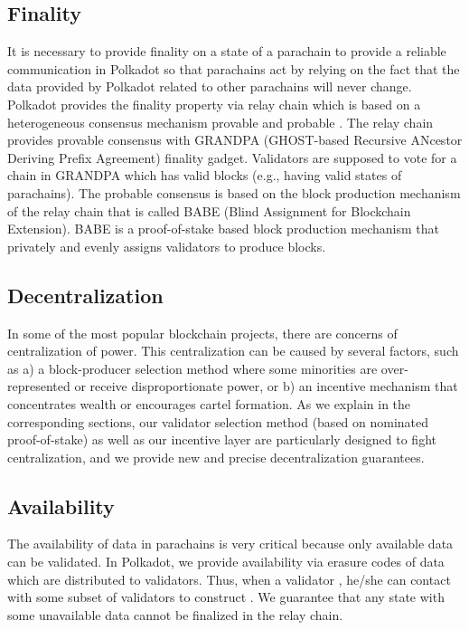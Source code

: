  \subsection{Finality}

 It is necessary to provide finality on a state of a parachain  to provide a reliable communication in Polkadot so that parachains act by relying on the fact that the data provided by Polkadot related to other parachains will never change.  Polkadot provides the finality property via relay chain which is based on a heterogeneous consensus mechanism  provable  and probable . The relay chain provides provable consensus with GRANDPA (GHOST-based Recursive ANcestor Deriving Prefix Agreement)  finality gadget. Validators are supposed to vote for a chain in GRANDPA  which has valid blocks (e.g., having valid states of parachains). The probable consensus is based on the block production mechanism of the relay chain that is called BABE (Blind Assignment for Blockchain Extension). BABE is a proof-of-stake based block production mechanism that privately and evenly assigns validators to produce blocks.

\subsection{Decentralization}

In some of the most popular blockchain projects, there are concerns of centralization of power.
This centralization can be caused by several factors, such as
a) a block-producer selection method where some minorities are over-represented or receive disproportionate power, or
b) an incentive mechanism that concentrates wealth or encourages cartel formation.
As we explain in the corresponding sections, our validator selection method (based on nominated proof-of-stake)
as well as our incentive layer are particularly designed to fight centralization,
and we provide new and precise decentralization guarantees.


 \subsection{Availability}\label{sec:availability}
The availability of data in parachains is very critical because only available data can be validated.  In Polkadot, we provide availability via erasure codes of data which are distributed to validators. Thus, when a validator , he/she can contact with some subset of validators to construct . We guarantee that any state with some unavailable data cannot be finalized in the relay chain.


